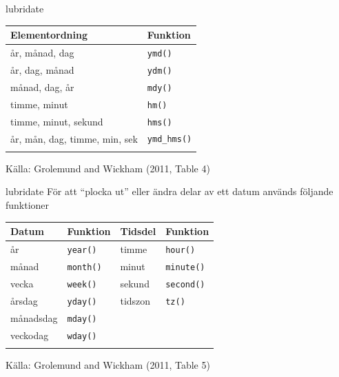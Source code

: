 \documentclass[
  11pt,
  ignorenonframetext,
  handout]{beamer}
\newcounter{none} %
\begin{document}
\begin{frame}[fragile]{lubridate}
\protect{}\label{lubridate-1}
{\def\LTcaptype{none} %
\begin{longtable}[]{@{}ll@{}}
\toprule\noalign{}
Elementordning & Funktion \\
\midrule\noalign{}
\endhead
år, månad, dag & \texttt{ymd()} \\
år, dag, månad & \texttt{ydm()} \\
månad, dag, år & \texttt{mdy()} \\
timme, minut & \texttt{hm()} \\
timme, minut, sekund & \texttt{hms()} \\
år, mån, dag, timme, min, sek & \texttt{ymd\_hms()} \\
\bottomrule\noalign{}
\end{longtable}
}

Källa: Grolemund and Wickham (2011, Table 4)
\end{frame}

\begin{frame}[fragile]{lubridate}
\protect{}\label{lubridate-2}
För att ``plocka ut'' eller ändra delar av ett datum används följande
funktioner

{\def\LTcaptype{none} %
\begin{longtable}[]{@{}llll@{}}
\toprule\noalign{}
Datum & Funktion & Tidsdel & Funktion \\
\midrule\noalign{}
\endhead
år & \texttt{year()} & timme & \texttt{hour()} \\
månad & \texttt{month()} & minut & \texttt{minute()} \\
vecka & \texttt{week()} & sekund & \texttt{second()} \\
årsdag & \texttt{yday()} & tidszon & \texttt{tz()} \\
månadsdag & \texttt{mday()} & & \\
veckodag & \texttt{wday()} & & \\
\bottomrule\noalign{}
\end{longtable}
}

Källa: Grolemund and Wickham (2011, Table 5)
\end{frame}
\end{document}
